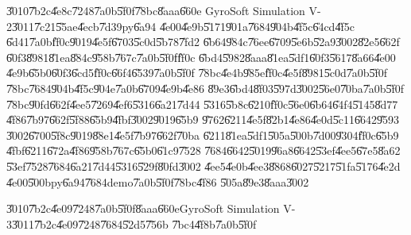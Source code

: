 \U{3010}\U{7b2c}\U{4e8c}\U{7248}\U{7a0b}\U{5f0f}\U{78bc}\U{8aaa}\U{660e}%
GyroSoft Simulation V-2\U{3011}\U{7c21}\U{55ae}\U{4ecb}\U{7d39}py\U{6a94}%
\U{4e00}\U{4e9b}\U{5171}\U{901a}\U{7684}\U{904b}\U{4f5c}\U{64cd}\U{4f5c}%
\U{6d41}\U{7a0b}\U{ff0c}\U{9019}\U{4e5f}\U{6703}\U{5c0d}\U{5b78}\U{7fd2}%
\U{6b64}\U{984c}\U{76ee}\U{6709}\U{5e6b}\U{52a9}\U{3002}\U{82e5}\U{662f}%
\U{60f3}\U{8981}\U{81ea}\U{884c}\U{958b}\U{767c}\U{7a0b}\U{5f0f}\U{ff0c}%
\U{6bd4}\U{5982}\U{8aaa}\U{81ea}\U{5df1}\U{60f3}\U{5617}\U{8a66}\U{4e00}%
\U{4e9b}\U{65b0}\U{60f3}\U{6cd5}\U{ff0c}\U{66f4}\U{6539}\U{7a0b}\U{5f0f}%
\U{78bc}\U{4e4b}\U{985e}\U{ff0c}\U{4e5f}\U{8981}\U{5c0d}\U{7a0b}\U{5f0f}%
\U{78bc}\U{7684}\U{904b}\U{4f5c}\U{904e}\U{7a0b}\U{6709}\U{4e9b}\U{4e86}%
\U{89e3}\U{6bd4}\U{8f03}\U{597d}\U{3002}\U{56e0}\U{70ba}\U{7a0b}\U{5f0f}%
\U{78bc}\U{90fd}\U{662f}\U{4ee5}\U{7269}\U{4ef6}\U{5316}\U{6a21}\U{7d44}%
\U{5316}\U{5b8c}\U{6210}\U{ff0c}\U{56e0}\U{6b64}\U{64f4}\U{5145}\U{8d77}%
\U{4f86}\U{7b97}\U{662f}\U{5f88}\U{65b9}\U{4fbf}\U{3002}\U{9019}\U{65b9}%
\U{9762}\U{6211}\U{4e5f}\U{82b1}\U{4e86}\U{4e0d}\U{5c11}\U{6642}\U{9593}%
\U{3002}\U{6700}\U{5f8c}\U{9019}\U{88e1}\U{4e5f}\U{7b97}\U{662f}\U{70ba}%
\U{6211}\U{81ea}\U{5df1}\U{505a}\U{500b}\U{7d00}\U{9304}\U{ff0c}\U{65b9}%
\U{4fbf}\U{6211}\U{672a}\U{4f86}\U{958b}\U{767c}\U{65b0}\U{61c9}\U{7528}%
\U{7684}\U{6642}\U{5019}\U{96a8}\U{6642}\U{53ef}\U{4ee5}\U{67e5}\U{8a62}%
\U{53ef}\U{7528}\U{7684}\U{6a21}\U{7d44}\U{5316}\U{529f}\U{80fd}\U{3002}%
\U{4ee5}\U{4e0b}\U{4ee3}\U{8868}\U{6027}\U{5217}\U{51fa}\U{5176}\U{4e2d}%
\U{4e00}\U{500b}py\U{6a94}\U{7684}demo\U{7a0b}\U{5f0f}\U{78bc}\U{4f86}%
\U{505a}\U{89e3}\U{8aaa}\U{3002}

\U{3010}\U{7b2c}\U{4e09}\U{7248}\U{7a0b}\U{5f0f}\U{8aaa}\U{660e}GyroSoft
Simulation V-3\U{3011}\U{7b2c}\U{4e09}\U{7248}\U{7684}\U{52d5}\U{756b}%
\U{7bc4}\U{4f8b}\U{7a0b}\U{5f0f}

\begin{mdframed}[leftline=false, rightline=false,backgroundcolor=bg]
\inputminted[linenos,fontsize=\footnotesize,breaklines,breakanywhere]{python}{../../Scripts/cordtrans/opengltest/cubegyro_opengl_animation_1.py}
\end{mdframed}%

